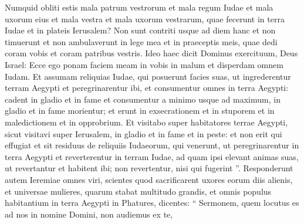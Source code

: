 \begin{biblechapter}
\begin{biblechapter}
\begin{biblechapter}
\begin{biblechapter}
\begin{biblechapter}
\begin{biblechapter}
\begin{biblechapter}
\begin{biblechapter}
\begin{biblechapter}
\begin{biblechapter}
\begin{biblechapter}
\begin{biblechapter}
\begin{biblechapter}
\begin{biblechapter}
\begin{biblechapter}
\begin{biblechapter}
\begin{biblechapter}
\begin{biblechapter}
\begin{biblechapter}
\begin{biblechapter}
\begin{biblechapter}
\begin{biblechapter}
\begin{biblechapter}
\begin{biblechapter}
\begin{biblechapter}
\begin{biblechapter}
\begin{biblechapter}
\begin{biblechapter}
\begin{biblechapter}
\begin{biblechapter}
\begin{biblechapter}
\begin{biblechapter}
\begin{biblechapter}
\begin{biblechapter}
\begin{biblechapter}
\begin{biblechapter}
\begin{biblechapter}
\begin{biblechapter}
\begin{biblechapter}
\begin{biblechapter}
\begin{biblechapter}
\begin{biblechapter}
\begin{biblechapter}
\begin{biblechapter}
\verse Numquid obliti estis mala patrum vestrorum et mala regum Iudae et mala uxorum eius et mala vestra et mala uxorum vestrarum, quae fecerunt in terra Iudae et in plateis Ierusalem? 
\verse Non sunt contriti usque ad diem hanc et non timuerunt et non ambulaverunt in lege mea et in praeceptis meis, quae dedi coram vobis et coram patribus vestris. 
\verse Ideo haec dicit Dominus exercituum, Deus Israel: Ecce ego ponam faciem meam in vobis in malum et disperdam omnem Iudam. 
\verse Et assumam reliquias Iudae, qui posuerunt facies suas, ut ingrederentur terram Aegypti et peregrinarentur ibi, et consumentur omnes in terra Aegypti: cadent in gladio et in fame et consumentur a minimo usque ad maximum, in gladio et in fame morientur; et erunt in exsecrationem et in stuporem et in maledictionem et in opprobrium. 
\verse Et visitabo super habitatores terrae Aegypti, sicut visitavi super Ierusalem, in gladio et in fame et in peste: 
\verse et non erit qui effugiat et sit residuus de reliquiis Iudaeorum, qui venerunt, ut peregrinarentur in terra Aegypti et reverterentur in terram Iudae, ad quam ipsi elevant animas suas, ut revertantur et habitent ibi; non revertentur, nisi qui fugerint ”.
 \verse Responderunt autem Ieremiae omnes viri, scientes quod sacrificarent uxores eorum diis alienis, et universae mulieres, quarum stabat multitudo grandis, et omnis populus habitantium in terra Aegypti in Phatures, dicentes: 
\verse “ Sermonem, quem locutus es ad nos in nomine Domini, non audiemus ex te, 

\end{biblechapter}
\end{biblechapter}
\end{biblechapter}
\end{biblechapter}
\end{biblechapter}
\end{biblechapter}
\end{biblechapter}
\end{biblechapter}
\end{biblechapter}
\end{biblechapter}
\end{biblechapter}
\end{biblechapter}
\end{biblechapter}
\end{biblechapter}
\end{biblechapter}
\end{biblechapter}
\end{biblechapter}
\end{biblechapter}
\end{biblechapter}
\end{biblechapter}
\end{biblechapter}
\end{biblechapter}
\end{biblechapter}
\end{biblechapter}
\end{biblechapter}
\end{biblechapter}
\end{biblechapter}
\end{biblechapter}
\end{biblechapter}
\end{biblechapter}
\end{biblechapter}
\end{biblechapter}
\end{biblechapter}
\end{biblechapter}
\end{biblechapter}
\end{biblechapter}
\end{biblechapter}
\end{biblechapter}
\end{biblechapter}
\end{biblechapter}
\end{biblechapter}
\end{biblechapter}
\end{biblechapter}
\end{biblechapter}
